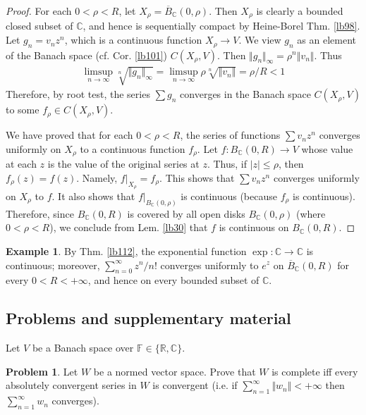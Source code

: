 \documentclass[12pt,b5paper,notitlepage]{article}
\theoremstyle{definition}
\newtheorem{eg}[df]{Example}
\newtheorem{prob}{\color{red}Problem}[section]
\theoremstyle{plain}
\newcommand{\ovl}{\overline}
\newcommand{\Cbb}{\mathbb C}
\newcommand{\Rbb}{\mathbb R}
\newcommand{\Fbb}{\mathbb F}
\numberwithin{equation}{section}
\begin{document}
\begin{proof}
For each $0<\rho<R$, let $X_\rho=\ovl B_\Cbb(0,\rho)$. Then $X_\rho$ is clearly a bounded closed subset of $\Cbb$, and hence is sequentially compact by Heine-Borel Thm. \ref{lb98}. Let $g_n=v_nz^n$, which is a continuous function $X_\rho\rightarrow V$. We view $g_n$ as an element of the Banach space (cf. Cor. \ref{lb101}) $C(X_\rho,V)$. Then $\Vert g_n\Vert_\infty=\rho^n\Vert v_n\Vert$. Thus
\begin{align*}
\limsup_{n\rightarrow\infty}\sqrt[n]{\Vert g_n\Vert_\infty}=\limsup_{n\rightarrow\infty}\rho\sqrt[n]{\Vert v_n\Vert}=\rho/R<1
\end{align*}
Therefore, by root test, the series $\sum g_n$ converges in the Banach space $C(X_\rho,V)$ to some $f_\rho\in C(X_\rho,V)$.

We have proved that for each $0<\rho<R$, the series of functions $\sum v_nz^n$ converges uniformly on $X_\rho$ to a continuous function $f_\rho$. Let $f:B_\Cbb(0,R)\rightarrow V$ whose value at each $z$ is the value of the original series at $z$. Thus, if $|z|\leq\rho$, then $f_\rho(z)=f(z)$. Namely, $f|_{X_\rho}=f_\rho$. This shows that $\sum v_nz^n$ converges uniformly on $X_\rho$ to $f$. It also shows that $f|_{B_\Cbb(0,\rho)}$ is continuous (because $f_\rho$ is continuous). Therefore, since $B_\Cbb(0,R)$ is covered by all open disks $B_\Cbb(0,\rho)$ (where $0<\rho<R$), we conclude from Lem. \ref{lb30} that $f$ is continuous on $B_\Cbb(0,R)$.
\end{proof}

\begin{eg}\label{lb214}
By Thm. \ref{lb112}, the exponential function $\exp:\Cbb\rightarrow\Cbb$ is continuous; moreover, $\sum_{n=0}^\infty z^n/n!$ converges uniformly to $e^z$ on $\ovl B_{\Cbb}(0,R)$ for every $0<R<+\infty$, and hence on every bounded subset of $\Cbb$.
\end{eg}



\subsection{Problems and supplementary material}


Let $V$ be a Banach space over $\Fbb\in\{\Rbb,\Cbb\}$. 

\begin{prob}\label{lb566}
Let $W$ be a normed vector space. Prove that $W$ is complete iff every absolutely convergent series in $W$ is convergent (i.e. if $\sum_{n=1}^\infty \Vert w_n\Vert<+\infty$ then $\sum_{n=1}^\infty w_n$ converges).
\end{prob}
\end{document}
